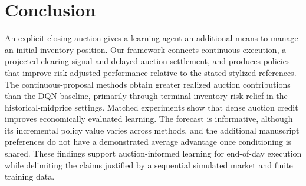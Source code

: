\section{Conclusion}
An explicit closing auction gives a learning agent an additional means to
manage an initial inventory position. Our framework connects continuous
execution, a projected clearing signal and delayed auction settlement, and
produces policies that improve risk-adjusted performance relative to the stated
stylized references. The continuous-proposal methods obtain greater realized
auction contributions than the DQN baseline, primarily through terminal
inventory-risk relief in the historical-midprice settings. Matched experiments
show that dense auction credit improves economically evaluated learning.
The forecast is informative, although its incremental policy value varies
across methods, and the additional manuscript preferences do not have a
demonstrated average advantage once conditioning is shared. These findings
support auction-informed learning for end-of-day execution while delimiting
the claims justified by a sequential simulated market and finite training data.
